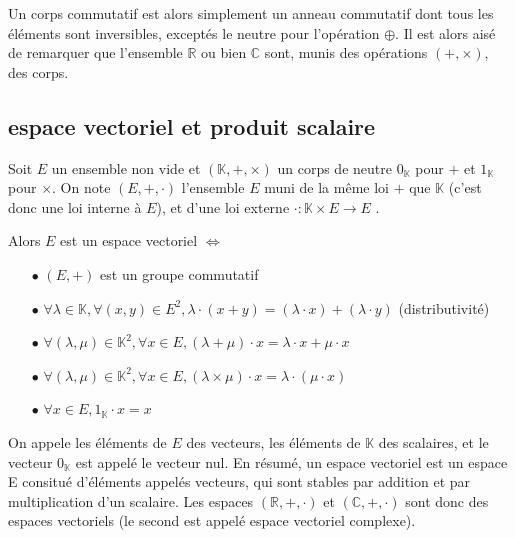\documentclass[a4paper,12pt]{report}
\begin{document}
\vspace{1\baselineskip}

\par{
	Un corps commutatif est alors simplement un anneau commutatif dont tous les éléments sont inversibles, exceptés le neutre pour l'opération $\oplus$. Il est alors aisé de remarquer que l'ensemble $\mathbb{R}$ ou bien $\mathbb{C}$ sont, munis des opérations $(+,\times)$, des corps.
}

		\subsection{espace vectoriel et produit scalaire}

\par{
	Soit $E$ un ensemble non vide et $(\mathbb{K},+,\times)$ un corps de neutre $0_{\mathbb{K}}$ pour $+$ et $1_{\mathbb{K}}$ pour $\times$. On note $(E,+,\cdot)$ l'ensemble $E$ muni de la même loi $+$ que $\mathbb{K}$ (c'est donc une loi interne à $E$), et d'une loi externe $\cdot : \mathbb{K} \times E \rightarrow E$ .
}

\par{
	Alors $E$ est un espace vectoriel $\Leftrightarrow$
}

\begin{itemize}
\item[$\bullet$] $ (E, +)$ est un groupe commutatif
\item[$\bullet$] $\forall \lambda \in \mathbb{K}, \forall (x,y) \in E^2, \lambda \cdot (x+y) = (\lambda \cdot x) + (\lambda \cdot y)$ (distributivité)
\item[$\bullet$] $\forall (\lambda, \mu) \in \mathbb{K}^2, \forall x \in E, (\lambda + \mu) \cdot x = \lambda \cdot x + \mu \cdot x$
\item[$\bullet$] $\forall (\lambda, \mu) \in \mathbb{K}^2, \forall x \in E, (\lambda \times \mu) \cdot x = \lambda \cdot (\mu \cdot x)$
\item[$\bullet$] $\forall x \in E, 1_{\mathbb{K}} \cdot x = x$
\end{itemize}

\vspace{1\baselineskip}

\par{
	On appele les éléments de $E$ des vecteurs, les éléments de $\mathbb{K}$ des scalaires, et le vecteur $0_{\mathbb{K}}$ est appelé le vecteur nul. En résumé, un espace vectoriel est un espace E consitué d'éléments appelés vecteurs, qui sont stables par addition et par multiplication d'un scalaire. Les espaces $(\mathbb{R},+,\cdot)$ et $(\mathbb{C},+,\cdot)$ sont donc des espaces vectoriels (le second est appelé espace vectoriel complexe).
}
\end{document}
